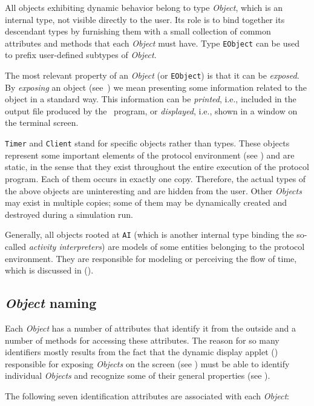 All objects exhibiting dynamic behavior belong to type {\em Object}, which
is an internal type, not visible directly to the user.
Its role is to bind together its descendant types by furnishing them with a
small collection of common attributes and methods that each
{\em Object\/} must have.
Type {\tt EObject} can be used to prefix user-defined subtypes of {\em Object}.

The most relevant property of
an {\em Object\/} (or {\tt EObject}) is that it can be
{\em exposed}.
By {\em exposing\/} an object (see~) we mean presenting some
information related to the object in a standard way.
This information can be {\em printed}, i.e.,
included in the output file produced by the \smurph\ program,
or {\em displayed},
i.e., shown in a window on the terminal screen.

{\tt Timer} and {\tt Client} stand for specific objects rather than types.
These objects represent some important elements of the protocol environment
(see )
and are static, in the sense that they exist throughout the entire execution
of the protocol program.
Each of them occurs in exactly one copy.
Therefore,
the actual types of the above objects are uninteresting and are hidden from
the user.
Other {\em Objects\/} may exist in multiple copies; some of them may be
dynamically created and destroyed during a simulation run.

Generally, all objects rooted at {\tt AI\/} (which is another internal type
binding the so-called {\em activity interpreters\/})
are models of some entities belonging to the protocol environment.
They are responsible for modeling or perceiving
the flow of time, which is discussed in ().

\subsection{{\em Object\/} naming}
\label{rm_st_on}

Each {\em Object\/} has a number of attributes that identify it from the outside
and a number of methods for accessing these attributes.
The reason for so many identifiers mostly results from the fact that the
dynamic display applet (\dsd)
responsible for exposing {\em Objects\/} on the screen (see
) must be
able to identify individual {\em Objects\/} and recognize some of their
general properties (see ).

The following seven identification attributes are associated with each
{\em Object\/}:

